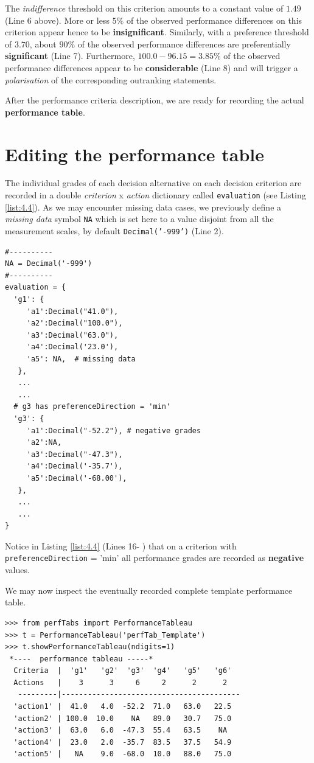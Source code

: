 The \emph{indifference} threshold on this criterion amounts to a constant value of $1.49$ (Line 6 above). More or less $5\%$ of the observed performance differences on this criterion appear hence to be \textbf{insignificant}. Similarly, with a preference threshold of $3.70$, about $90\%$ of the observed performance differences are preferentially \textbf{significant} (Line 7). Furthermore, $100.0 - 96.15 = 3.85\%$ of the observed performance differences appear to be \textbf{considerable} (Line 8) and will trigger a \emph{polarisation} of the corresponding outranking statements.

After the performance criteria description, we are ready for recording the actual \textbf{performance table}.

\section{Editing the performance table}
\label{sec:4.5}

The individual grades of each decision alternative on each decision criterion are recorded in a double \emph{criterion} x \emph{action} dictionary called \texttt{evaluation} (see Listing \ref{list:4.4}). As we may encounter missing data cases, we previously define a \emph{missing data} symbol \texttt{NA} which is set here to a value disjoint from all the measurement scales, by default \texttt{Decimal('-999')} (Line 2).

\begin{lstlisting}[caption={Editing performance grades},label=list:4.5,basicstyle=\footnotesize]
#----------
NA = Decimal('-999')
#----------
evaluation = {
  'g1': {
     'a1':Decimal("41.0"),
     'a2':Decimal("100.0"),
     'a3':Decimal("63.0"),
     'a4':Decimal('23.0'),
     'a5': NA,  # missing data
   },
   ...
   ...
  # g3 has preferenceDirection = 'min'
  'g3': {
     'a1':Decimal("-52.2"), # negative grades
     'a2':NA,
     'a3':Decimal("-47.3"),
     'a4':Decimal('-35.7'),
     'a5':Decimal('-68.00'),
   },
   ...
   ...
}
\end{lstlisting}

Notice in Listing \ref{list:4.4} (Lines 16- ) that on a criterion with \texttt{preferenceDirection} = 'min' all performance grades are recorded as \textbf{negative} values.

We may now inspect the eventually recorded complete template performance table.

\begin{lstlisting}[basicstyle=\footnotesize]
>>> from perfTabs import PerformanceTableau   
>>> t = PerformanceTableau('perfTab_Template')
>>> t.showPerformanceTableau(ndigits=1)
 *----  performance tableau -----*
  Criteria  |  'g1'   'g2'  'g3'  'g4'   'g5'   'g6'   
  Actions   |    3      3     6     2      2      2    
   ---------|-----------------------------------------
  'action1' |  41.0   4.0  -52.2  71.0   63.0   22.5  
  'action2' | 100.0  10.0    NA   89.0   30.7   75.0  
  'action3' |  63.0   6.0  -47.3  55.4   63.5    NA   
  'action4' |  23.0   2.0  -35.7  83.5   37.5   54.9  
  'action5' |   NA    9.0  -68.0  10.0   88.0   75.0
\end{lstlisting}


